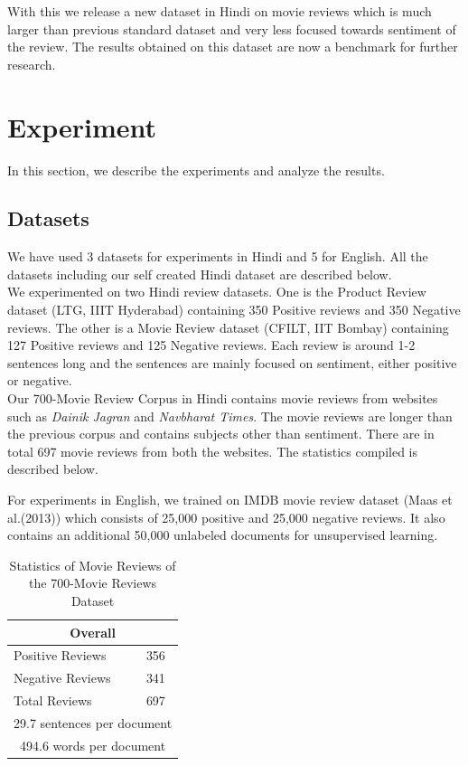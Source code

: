 \documentclass[11pt,a4paper]{article}
\begin{document}
With this we release a new dataset in Hindi on movie reviews which is much larger than previous standard dataset and very less focused towards sentiment of the review. The results obtained on this dataset are now a benchmark for further research.

\section{Experiment}
\label{sec:experiment}
In this section, we describe the experiments and analyze the results.

\subsection{Datasets}
We have used 3 datasets for experiments in Hindi and 5 for English. All the datasets including our self created Hindi dataset are described below.\\
We experimented on two Hindi review datasets. One is the Product Review dataset (LTG, IIIT Hyderabad) containing 350 Positive reviews and 350 Negative reviews. The other is a Movie Review dataset (CFILT, IIT Bombay) containing 127 Positive reviews and 125 Negative reviews. Each review is around 1-2 sentences long and the sentences are mainly focused on sentiment, either positive or negative.\\
Our 700-Movie Review Corpus in Hindi contains movie reviews from websites such as \emph{Dainik Jagran} and \emph{Navbharat Times}. The movie reviews are longer than the previous corpus and contains subjects other than sentiment. There are in total 697 movie reviews from both the websites. The statistics compiled is described below.

For experiments in English, we trained on IMDB movie review dataset (Maas et al.(2013)) which consists of 25,000 positive and 25,000 negative reviews. It also contains an additional 50,000 unlabeled documents for unsupervised learning.
\begin {table}[H]
\centering
\begin{tabular}{ |l|l| }
\hline
\multicolumn{2}{|c|}{\textbf{Overall}} \\
\hline
Positive Reviews & 356 \\ 
Negative Reviews & 341 \\
Total Reviews & 697\\ \hline
\multicolumn{2}{|c|}{29.7 sentences per document} \\ \hline
\multicolumn{2}{|c|}{494.6 words per document} \\
\hline
\end{tabular}
\caption {Statistics of Movie Reviews of the 700-Movie Reviews Dataset}
\end{table}
\end{document}

